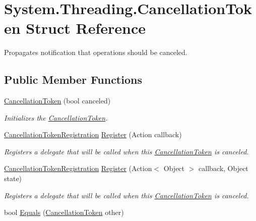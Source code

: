 \hypertarget{struct_system_1_1_threading_1_1_cancellation_token}{}\section{System.\+Threading.\+Cancellation\+Token Struct Reference}
\label{struct_system_1_1_threading_1_1_cancellation_token}


Propagates notification that operations should be canceled.  


\subsection*{Public Member Functions}
\begin{DoxyCompactItemize}
\item 
\hyperlink{struct_system_1_1_threading_1_1_cancellation_token_a95dbce917e10c35de78ca57155fdfee4}{Cancellation\+Token} (bool canceled)
\begin{DoxyCompactList}\small\item\em Initializes the \hyperlink{}{Cancellation\+Token}. \end{DoxyCompactList}\item 
\hyperlink{struct_system_1_1_threading_1_1_cancellation_token_registration}{Cancellation\+Token\+Registration} \hyperlink{struct_system_1_1_threading_1_1_cancellation_token_a62e3229ea2687c0b5f6e7ede454b8236}{Register} (Action callback)
\begin{DoxyCompactList}\small\item\em Registers a delegate that will be called when this \hyperlink{}{Cancellation\+Token} is canceled. \end{DoxyCompactList}\item 
\hyperlink{struct_system_1_1_threading_1_1_cancellation_token_registration}{Cancellation\+Token\+Registration} \hyperlink{struct_system_1_1_threading_1_1_cancellation_token_a85a6199ca14938b28a3fd418c145ff85}{Register} (Action$<$ Object $>$ callback, Object state)
\begin{DoxyCompactList}\small\item\em Registers a delegate that will be called when this \hyperlink{}{Cancellation\+Token} is canceled. \end{DoxyCompactList}\item 
bool \hyperlink{struct_system_1_1_threading_1_1_cancellation_token_a774b38149683d6b99a6a5190198ad629}{Equals} (\hyperlink{struct_system_1_1_threading_1_1_cancellation_token}{Cancellation\+Token} other)

\end{DoxyCompactItemize}
